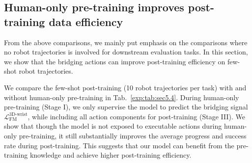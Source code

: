 \documentclass{llmxive}
\begin{document}
\begin{table}[htbp]
\centering
{}
\label{exp:tab:sec5.3}
\caption{
    \textbf{Comparison on human action representation.}
    We compare 6DoF and translation-only (3DoF) human actions for human--robot co-training (from scratch).
    Our bridging action achieves better quantitative results on evaluation tasks.
}
\end{table}






\subsection{Human-only pre-training improves post-training data efficiency}
\label{exp:sec:few-shot}


From the above comparisons, we mainly put emphasis on the comparisons where no robot trajectories is involved for downstream evaluation tasks.
% 
In this section, we show that the bridging actions can improve post-training efficiency on few-shot robot trajectories.


We compare the few-shot post-training (10 robot trajectories per task) with and without human-only pre-training in Tab.~\ref{exp:tab:sec5.4}.
% 
During human-only pre-training (Stage I), we only supervise the model to predict the bridging signal $\mathcal{L}_{\text{FM}}^{\text{3D-wrist}}$, while including all action components for post-training (Stage III).
% 
We show that though the model is not exposed to executable actions during human-only pre-training, it still substantially improves the average progress and success rate during post-training.
% 
This suggests that our model can benefit from the pre-training knowledge and achieve higher post-training efficiency.
\end{document}
